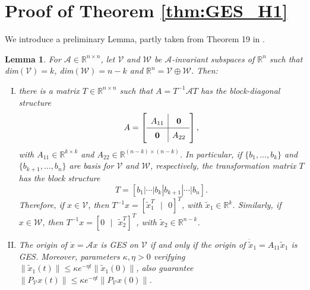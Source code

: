 \documentclass[a4paper]{article}
\theoremstyle{plain}
\newtheorem{lem}{Lemma}
\newcommand{\Rset}{\mathbb{R}}
\begin{document}
     \appendix
    \section{Proof of Theorem \ref{thm:GES_H1}}
\label{appendix_1}
We introduce a preliminary Lemma, partly taken from Theorem 19 in \cite{callier2012linear}.
\begin{lem}
	\label{lem:stability}
	For $\mathcal{A}\in\mathbb{R}^{n\times n}$, let $\mathcal{V}$ and $\mathcal{W}$ be $\mathcal{A}$-invariant subspaces of $\mathbb{R}^n$ such that dim$(\mathcal{V}) = k$, dim$(\mathcal{W}) = n-k$ and $\mathbb{R}^n = \mathcal{V}\oplus\mathcal{W}$. Then:
	\begin{enumerate}[I)]
		\item \label{thm:stability_1} there is a matrix $T\in\mathbb{R}^{n\times n}$ such that $A  = T^{-1}\mathcal{A} T$ has the block-diagonal structure 
		\begin{equation}
		\label{eq:repres_matrix}
		A = \left[ 
		\renewcommand\arraystretch{1.4}
		\begin{array}{c|cc}
		A_{11} &  \mathbf{0}  \\
		\hline
		\mathbf{0}  & A_{22}\\
		\end{array}\right],
		\end{equation}
		with $A_{11}\in\mathbb{R}^{k\times k}$ and $A_{22}\in\mathbb{R}^{(n-k)\times (n-k)}$.
		In particular, if $\{b_1, \dots, b_k\}$ and $\{b_{k+1},\dots,b_{n}\}$ are basis for $\mathcal{V}$ and $\mathcal{W}$, respectively, the transformation matrix $T$ has the block structure
		\begin{equation}
		\label{eq:matrix_T}
		T = [b_1 | \cdots |b_k|b_{k+1}|\cdots|b_{n}].
		\end{equation}
		Therefore, if $x\in\mathcal{V}$, then $T^{-1}x=[\tilde{x}_1^T \text{ } |	\text{ } 0]^T$, with $\tilde{x}_1 \in\Rset^k$. Similarly, if $x\in\mathcal{W}$, then $T^{-1}x=[ 0 \text{ } |	\text{ } \tilde{x}_2^T]^T$, with $\tilde{x}_2\in\Rset^{n-k}$.
		\item\label{thm:stability_2} The origin of $\dot x = \mathcal{A} x$ is GES on $\mathcal{V}$ if and only if the origin of  $\dot{\tilde{x}}_1 = A_{11}\tilde{x}_1$ is GES. Moreover, parameters $\kappa, \eta>0$ verifying $\lVert\tilde{x}_1(t) \rVert\leq\kappa e^{-\eta t}\lVert\tilde{x}_1(0) \rVert$, also guarantee $\lVert P_{\mathcal{V}}x(t) \rVert\leq\kappa e^{-\eta t}\lVert P_{\mathcal{V}}x(0) \rVert$.
	\end{enumerate}
\end{lem}
\end{document}
